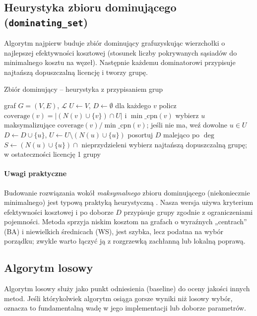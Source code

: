 \subsection{Heurystyka zbioru dominującego (\texttt{dominating\_set})}\label{subsec:ds}

Algorytm najpierw buduje zbiór dominujący grafuzyskując wierzchołki o najlepszej efektywności kosztowej (stosunek liczby pokrywanych sąsiadów do minimalnego kosztu na węzeł). Następnie każdemu dominatorowi przypisuje najtańszą dopuszczalną licencję i tworzy grupę.

\begin{algorithm}[H]
\caption{Zbiór dominujący -- heurystyka z przypisaniem grup}
\label{alg:ds}
\begin{algorithmic}[1]
\Require graf $G=(V,E)$, $\mathcal{L}$
\State $U\gets V$, $D\gets\emptyset$
  \State dla każdego $v$ policz $\mathrm{coverage}(v)=|(N(v)\cup\{v\})\cap U|$ i $\min\_\mathrm{cpn}(v)$
  \State wybierz $u$ maksymalizujące $\mathrm{coverage}(v)/\min\_\mathrm{cpn}(v)$; jeśli nie ma, weź dowolne $u\in U$
  \State $D\gets D\cup\{u\}$, $U\gets U\setminus(N(u)\cup\{u\})$
\EndWhile
\State posortuj $D$ malejąco po $\deg$
  \State $S\gets(N(u)\cup\{u\})\cap$ nieprzydzieleni
  \State wybierz najtańszą dopuszczalną grupę; w ostateczności licencję 1
\EndFor
\State \Return grupy
\end{algorithmic}
\end{algorithm}

\paragraph{Uwagi praktyczne}
Budowanie rozwiązania wokół \emph{maksymalnego} zbioru dominującego (niekoniecznie minimalnego) jest typową praktyką heurystyczną \cite{haynes1998domination}. Nasza wersja używa kryterium efektywności kosztowej i po doborze $D$ przypisuje grupy zgodnie z ograniczeniami pojemności. Metoda sprzyja niskim kosztom na grafach o wyraźnych „centrach” (BA) i niewielkich średnicach (WS), jest szybka, lecz podatna na wybór porządku; zwykle warto łączyć ją z rozgrzewką zachłanną lub lokalną poprawą.

\subsection{Algorytm losowy}\label{subsec:random}

Algorytm losowy służy jako punkt odniesienia (baseline) do oceny jakości innych metod. Jeśli którykolwiek algorytm osiąga gorsze wyniki niż losowy wybór, oznacza to fundamentalną wadę w jego implementacji lub doborze parametrów.


